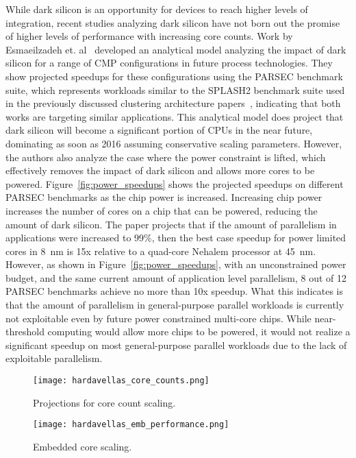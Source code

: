 While dark silicon is an opportunity for devices to reach higher levels of
integration, recent studies analyzing dark silicon have not born out the promise
of higher levels of performance with increasing core counts.  Work by
Esmaeilzadeh et. al~\cite{Esmaeilzadeh2011Dark-silicon-an} developed an
analytical model analyzing the impact of dark silicon for a range of CMP
configurations in future process technologies. They show projected speedups for
these configurations using the PARSEC benchmark suite,
which represents workloads similar to the SPLASH2 benchmark suite used in the
previously discussed clustering architecture
papers~\cite{dreslinski2010near,Zhai:2007kn}, indicating that both works are targeting
similar applications. This analytical model does project that dark silicon will
become a significant portion of CPUs in the near future, dominating as soon as
2016 assuming conservative scaling parameters. However, the authors also analyze
the case where the power constraint is lifted, which effectively removes the
impact of dark silicon and allows more cores to be powered.
Figure~\ref{fig:power_speedups} shows the projected speedups on different PARSEC
benchmarks as the chip power is increased. Increasing chip power increases the
number of cores on a chip that can be powered, reducing the amount of dark
silicon.  The paper projects that if the amount of parallelism in applications
were increased to 99\%, then the best case speedup for power limited cores in
\SI{8}{\nano\meter} is 15x relative to a quad-core Nehalem processor at
\SI{45}{\nano\meter}. However, as shown in Figure~\ref{fig:power_speedups}, with
an unconstrained power budget, and the same current amount of application level
parallelism, 8 out of 12 PARSEC benchmarks achieve no more than 10x speedup.
What this indicates is that the amount of parallelism in general-purpose
parallel workloads is currently not exploitable even by future power constrained
multi-core chips. While near-threshold computing would allow more chips to be
powered, it would not realize a significant speedup on most general-purpose
parallel workloads due to the lack of exploitable parallelism.

\begin{figure}[thpb] \centering
\texttt{[image: hardavellas\_core\_counts.png]}
\caption{Projections for core count scaling.~\cite{Hardavellas:2011de}}
\label{fig:core_counts} \end{figure}

\begin{figure}[thpb] \centering
\texttt{[image: hardavellas\_emb\_performance.png]}
\caption{Embedded core scaling.~\cite{Hardavellas:2011de}}
\label{fig:emb_performance} \end{figure}

